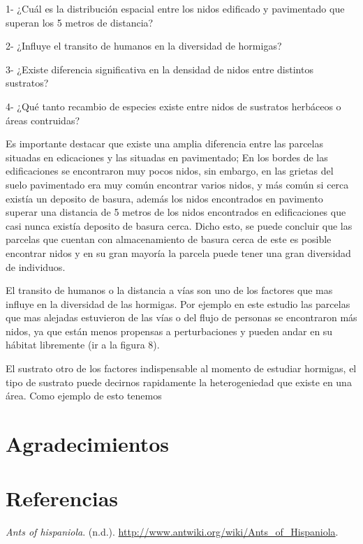 \documentclass[11pt,]{article}
\begin{document}
1- ¿Cuál es la distribución espacial entre los nidos edificado y
pavimentado que superan los 5 metros de distancia?

2- ¿Influye el transito de humanos en la diversidad de hormigas?

3- ¿Existe diferencia significativa en la densidad de nidos entre
distintos sustratos?

4- ¿Qué tanto recambio de especies existe entre nidos de sustratos
herbáceos o áreas contruidas?

Es importante destacar que existe una amplia diferencia entre las
parcelas situadas en edicaciones y las situadas en pavimentado; En los
bordes de las edificaciones se encontraron muy pocos nidos, sin embargo,
en las grietas del suelo pavimentado era muy común encontrar varios
nidos, y más común si cerca existía un deposito de basura, además los
nidos encontrados en pavimento superar una distancia de 5 metros de los
nidos encontrados en edificaciones que casi nunca existía deposito de
basura cerca. Dicho esto, se puede concluir que las parcelas que cuentan
con almacenamiento de basura cerca de este es posible encontrar nidos y
en su gran mayoría la parcela puede tener una gran diversidad de
individuos.

El transito de humanos o la distancia a vías son uno de los factores que
mas influye en la diversidad de las hormigas. Por ejemplo en este
estudio las parcelas que mas alejadas estuvieron de las vías o del flujo
de personas se encontraron más nidos, ya que están menos propensas a
perturbaciones y pueden andar en su hábitat libremente (ir a la figura
8).

El sustrato otro de los factores indispensable al momento de estudiar
hormigas, el tipo de sustrato puede decirnos rapidamente la
heterogeniedad que existe en una área. Como ejemplo de esto tenemos

\section{Agradecimientos}\label{agradecimientos}

\section*{Referencias}\label{referencias}

\hypertarget{refs}{}
\hypertarget{ref-AntWiki}{}
\emph{Ants of hispaniola}. (n.d.).
\url{http://www.antwiki.org/wiki/Ants_of_Hispaniola}.
\end{document}

